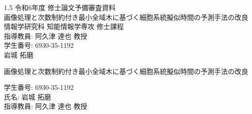 \documentclass{article}
\begin{document}
\begin{center}\begin{spacing}{1.5}
    \centering
    {\LARGE 令和6年度 修士論文予備審査資料\\}
    \vspace*{\fill} %
    {\LARGE 画像処理と次数制約付き最小全域木に基づく細胞系統擬似時間の予測手法の改良\\}
    \vspace*{\fill}
    {\LARGE 情報学研究科 知能情報学専攻 修士課程\\指導教員: 阿久津 達也 教授\\学生番号: 6930-35-1192 \\ 岩城 拓磨 \\}
\end{spacing}\end{center}
\pagebreak
\begin{center}
    \centering
    {\LARGE 画像処理と次数制約付き最小全域木に基づく細胞系統擬似時間の予測手法の改良\\}
\end{center}
学生番号: 6930-35-1192\\氏名: 岩城 拓磨 \\ 指導教員: 阿久津 達也 教授
\end{document}

